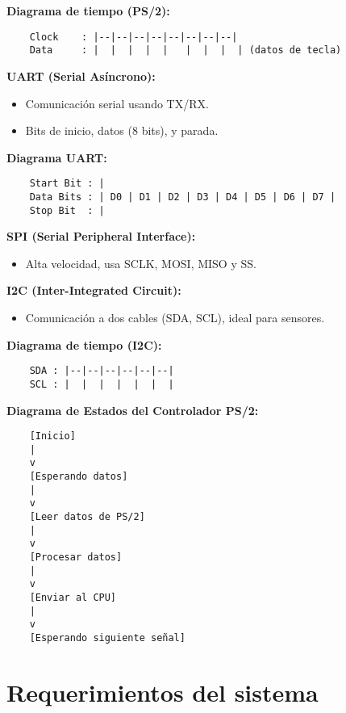 \documentclass[conference]{IEEEtran}
\begin{document}
\textbf{Diagrama de tiempo (PS/2):}
\begin{verbatim}
	Clock    : |--|--|--|--|--|--|--|--|
	Data     : |  |  |  |  |   |  |  |  | (datos de tecla)
\end{verbatim}

\textbf{UART (Serial Asíncrono):}
\begin{itemize}
	\item Comunicación serial usando TX/RX.
	\item Bits de inicio, datos (8 bits), y parada.
\end{itemize}

\textbf{Diagrama UART:}
\begin{verbatim}
	Start Bit : |
	Data Bits : | D0 | D1 | D2 | D3 | D4 | D5 | D6 | D7 |
	Stop Bit  : |
\end{verbatim}

\textbf{SPI (Serial Peripheral Interface):}
\begin{itemize}
	\item Alta velocidad, usa SCLK, MOSI, MISO y SS.
\end{itemize}

\textbf{I2C (Inter-Integrated Circuit):}
\begin{itemize}
	\item Comunicación a dos cables (SDA, SCL), ideal para sensores.
\end{itemize}

\textbf{Diagrama de tiempo (I2C):}
\begin{verbatim}
	SDA : |--|--|--|--|--|--|
	SCL : |  |  |  |  |  |  |
\end{verbatim}

\textbf{Diagrama de Estados del Controlador PS/2:}
\begin{verbatim}
	[Inicio] 
	|
	v
	[Esperando datos]
	|
	v
	[Leer datos de PS/2]
	|
	v
	[Procesar datos]
	|
	v
	[Enviar al CPU]
	|
	v
	[Esperando siguiente señal]
\end{verbatim}

\section{Requerimientos del sistema}
\end{document}
